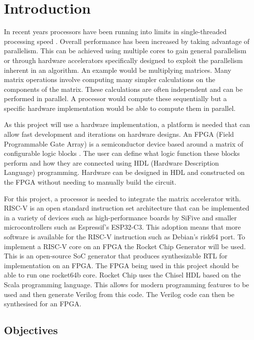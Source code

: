 \section{Introduction}
In recent years processors have been running into limits in single-threaded processing speed \cite{cpu_clk_speed}. Overall performance has been increased by taking advantage of parallelism. This can be achieved using multiple cores to gain general parallelism or through hardware accelerators specifically designed to exploit the parallelism inherent in an algorithm. An example would be multiplying matrices. Many matrix operations involve computing many simpler calculations on the components of the matrix. These calculations are often independent and can be performed in parallel. A processor would compute these sequentially but a specific hardware implementation would be able to compute them in parallel.

As this project will use a hardware implementation, a platform is needed that can allow fast development and iterations on hardware designs. An FPGA (Field Programmable Gate Array) is a semiconductor device based around a matrix of configurable logic blocks \citep{whatisanfpga}. The user can define what logic function these blocks perform and how they are connected using HDL (Hardware Description Language) programming. Hardware can be designed in HDL and constructed on the FPGA without needing to manually build the circuit.

For this project, a processor is needed to integrate the matrix accelerator with. RISC-V is an open standard instruction set architecture that can be implemented in a variety of devices such as high-performance boards by SiFive and smaller microcontrollers such as Espressif's ESP32-C3. This adoption means that more software is available for the RISC-V instruction such as Debian's risk64 port. To implement a RISC-V core on an FPGA the Rocket Chip Generator will be used. This is an open-source SoC generator that produces synthesizable RTL for implementation on an FPGA. The FPGA being used in this project should be able to run one rocket64b core. Rocket Chip uses the Chisel HDL based on the Scala programming language. This allows for modern programming features to be used and then generate Verilog from this code. The Verilog code can then be synthesised for an FPGA.


\subsection{Objectives}

